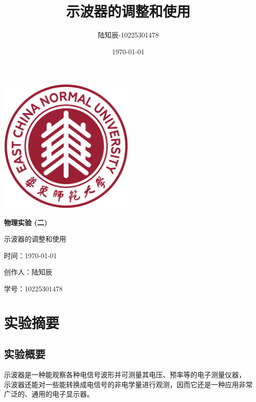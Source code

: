 \documentclass{ctexart}
\title{示波器的调整和使用}
\author{陆知辰-10225301478}
\date{\today}
\begin{document}
\begin{titlepage}
  \centering
  \includegraphics[width=0.5\textwidth]{ecnu.png}
  
  \vspace*{\baselineskip}
  
  \Huge\textbf{物\quad 理\quad 实\quad 验 \quad (二)}
  \vspace*{0.3\baselineskip}
  
  \huge 示波器的调整和使用
  
  \vspace*{2\baselineskip}
  
  \large 时间：\today
  
  \vspace*{\baselineskip}
  
  \large 创作人：陆知辰
  
  \vspace*{\baselineskip}
  
  \large 学号：10225301478
  
\end{titlepage}
\newpage
\tableofcontents
\newpage
\section{实验摘要}
  \subsection{实验概要}
  示波器是一种能观察各种电信号波形并可测量其电压、预率等的电子测量仪器，
  示波器还能对一些能转换成电信号的非电学量进行观测，因而它还是一种应用非常广泛的、通用的电子显示器。
\end{document}
